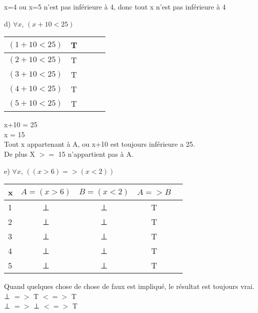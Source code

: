 \vspace{4mm}

x=4 ou x=5 n'est pas inférieure à 4, donc tout x n'est pas inférieure à 4 \\

\vspace{5mm}

d) $∀x$, $(x + 10 < 25)$ \\

\begin{tabular}{|l|c|c|c|c|}
  \hline
  $(1 + 10 < 25)$ & T \\
  \hline
  $(2 + 10 < 25)$ & T \\
  \hline
  $(3 + 10 < 25)$ & T \\
  \hline
  $(4 + 10 < 25)$ & T \\
  \hline
  $(5 + 10 < 25)$ & T \\
  \hline
\end{tabular}

\vspace{4mm}

x+10 = 25 \\
x = 15 \\

Tout x appartenant à A, ou x+10 est toujours inférieure a 25. \\

De plus X $>=$ 15 n'appartient pas à A. \\

\newpage

e) $∀x$, $((x > 6) => (x < 2))$ \\

\begin{tabular}{|l|c|c|c|c|}
  \hline
  x & $A=(x > 6)$ & $B=(x < 2)$ & $A => B$ \\
  \hline
  1 & ⊥ & ⊥ & T \\
  \hline
  2 & ⊥ & ⊥ & T \\
  \hline
  3 & ⊥ & ⊥ & T \\
  \hline
  4 & ⊥ & ⊥ & T \\
  \hline
  5 & ⊥ & ⊥ & T \\
  \hline
\end{tabular}

\vspace{4mm}

Quand quelques chose de chose de faux est impliqué, le résultat est toujours vrai. \\

⊥ $=>$ T $<=>$ T \\
⊥ $=>$ ⊥ $<=>$ T \\

